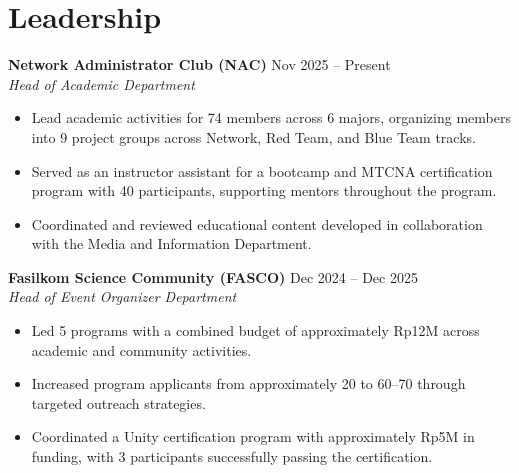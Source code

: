 \section*{Leadership}

\textbf{Network Administrator Club (NAC)} \hfill Nov 2025 -- Present\\
\textit{Head of Academic Department}

\begin{itemize}
    \item Lead academic activities for 74 members across 6 majors,
    organizing members into 9 project groups across Network, Red Team,
    and Blue Team tracks.
    \item Served as an instructor assistant for a bootcamp and MTCNA
    certification program with 40 participants, supporting mentors
    throughout the program.
    \item Coordinated and reviewed educational content developed in
    collaboration with the Media and Information Department.
\end{itemize}

\textbf{Fasilkom Science Community (FASCO)} \hfill Dec 2024 -- Dec 2025\\
\textit{Head of Event Organizer Department}

\begin{itemize}
    \item Led 5 programs with a combined budget of approximately
    Rp12M across academic and community activities.
    \item Increased program applicants from approximately 20 to
    60--70 through targeted outreach strategies.
    \item Coordinated a Unity certification program with approximately
    Rp5M in funding, with 3 participants successfully passing the
    certification.
\end{itemize}